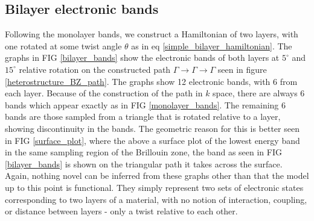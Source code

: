 \documentclass[12pt]{report} %
\begin{document}
\subsection*{Bilayer electronic bands}
Following the monolayer bands, we construct a Hamiltonian of two layers, with one rotated at some twist angle $\theta$ as in eq \ref{simple_bilayer_hamiltonian}. The graphs in FIG \ref{bilayer_bands} show the electronic bands of both layers at $5^\circ$ and $15^\circ$ relative rotation on the constructed path $\Gamma \rightarrow \Gamma \rightarrow \Gamma$ seen in figure \ref{heterostructure_BZ_path}. The graphs show 12 electronic bands, with 6 from each layer. Because of the construction of the path in $k$ space, there are always 6 bands which appear exactly as in FIG \ref{monolayer_bands}. The remaining 6 bands are those sampled from a triangle that is rotated relative to a layer, showing discontinuity in the bands. The geometric reason for this is better seen in FIG \ref{surface_plot}, where the above a surface plot of the lowest energy band in the same sampling region of the Brillouin zone, the band as seen in FIG \ref{bilayer_bands} is shown on the triangular path it takes across the surface. Again, nothing novel can be inferred from these graphs other than that the model up to this point is functional. They simply represent two sets of electronic states corresponding to two layers of a material, with no notion of interaction, coupling, or distance between layers - only a twist relative to each other. 
%
\end{document}
